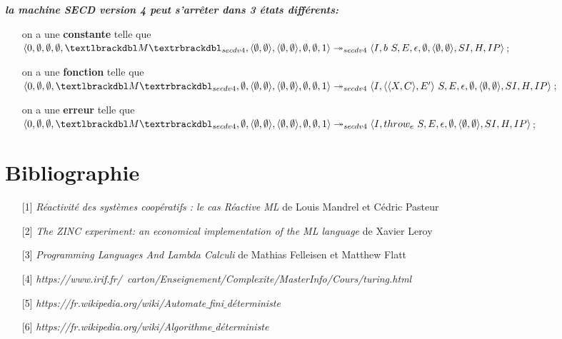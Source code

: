 \documentclass[10pt,a4paper]{report}
\begin{document}
\textbf{\textit{la machine SECD version 4 peut s'arrêter dans 3 états différents:}}
\smallbreak
\begin{itemize}
\item[] on a une \textbf{constante} telle que $\langle 0,\emptyset,\emptyset,\emptyset,\textlbrackdbl M\textrbrackdbl_{secdv4},\langle\emptyset,\emptyset\rangle,\langle\emptyset,\emptyset\rangle,\emptyset,\emptyset,1\rangle \\
  \twoheadrightarrow_{secdv4} \langle I,b~S,E,\epsilon,\emptyset,\langle\emptyset,\emptyset\rangle,SI,H,IP\rangle$;
\item[] 
\item[] on a une \textbf{fonction} telle que
  $\langle 0,\emptyset,\emptyset,\textlbrackdbl M\textrbrackdbl_{secdv4},\emptyset,\langle\emptyset,\emptyset\rangle,\langle\emptyset,\emptyset\rangle,\emptyset,\emptyset,1\rangle \\
  \twoheadrightarrow_{secdv4} \langle I,\langle\langle X,C\rangle,E'\rangle~S,E,\epsilon,\emptyset,\langle\emptyset,\emptyset\rangle,SI,H,IP\rangle$;
\item[] 
\item[] on a une \textbf{erreur} telle que 
  $\langle 0,\emptyset,\emptyset,\textlbrackdbl M\textrbrackdbl_{secdv4},\emptyset,\langle\emptyset,\emptyset\rangle,\langle\emptyset,\emptyset\rangle,\emptyset,\emptyset,1\rangle \\
  \twoheadrightarrow_{secdv4} \langle I,throw_{e}~S,E,\epsilon,\emptyset,\langle\emptyset,\emptyset\rangle,SI,H,IP\rangle$;
\end{itemize}
\newpage



\section{Bibliographie}
\begin{itemize}
\item[] [1] \textit{Réactivité des systèmes coopératifs : le cas Réactive ML} de Louis Mandrel et Cédric Pasteur\label{ReactiveML}
\item[] [2] \textit{The ZINC experiment: an economical implementation of the ML language} de Xavier Leroy\label{ZINC}
\item[] [3] \textit{Programming Languages And Lambda Calculi} de Mathias Felleisen et Matthew Flatt\label{Calculi}
\item[] [4] \textit{https://www.irif.fr/~carton/Enseignement/Complexite/MasterInfo/Cours/turing.html}\label{Turing}
\item[] [5] \textit{https://fr.wikipedia.org/wiki/Automate$\_$fini$\_$déterministe}\label{AFD}
\item[] [6] \textit{https://fr.wikipedia.org/wiki/Algorithme$\_$déterministe}\label{MFD}
\end{itemize}
\end{document}
